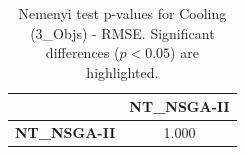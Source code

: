 \begin{table}[h!]
\centering
\scriptsize
\begin{tabular}{lc}
\toprule
 & NT\_NSGA-II \\
\midrule
\textbf{NT\_NSGA-II} & 1.000 \\
\bottomrule
\end{tabular}
\caption{Nemenyi test p-values for Cooling (3_Objs) - RMSE. Significant differences ($p < 0.05$) are highlighted.}
\label{tab:nemenyi_nemenyi_Cooling_3_Objs_Test_RMSE}
\end{table}